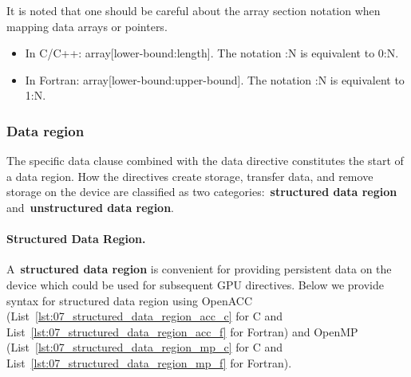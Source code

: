\par
It is noted that one should be careful about the array section notation when mapping data arrays or pointers.
\begin{itemize}
    \item In C/C++: array[lower-bound:length]. The notation :N is equivalent to 0:N.
    \item In Fortran: array[lower-bound:upper-bound]. The notation :N is equivalent to 1:N.
\end{itemize}


\subsubsection{Data region}


\par
The specific data clause combined with the data directive constitutes the start of a data region.
How the directives create storage, transfer data, and remove storage on the device are classified as two categories:~\textbf{structured data region} and~\textbf{unstructured data region}.


\paragraph{Structured Data Region.}
A~\textbf{structured data region} is convenient for providing persistent data on the device which could be used for subsequent GPU directives.
Below we provide syntax for structured data region using OpenACC (List~\ref{lst:07_structured_data_region_acc_c} for C and List~\ref{lst:07_structured_data_region_acc_f} for Fortran) and OpenMP (List~\ref{lst:07_structured_data_region_mp_c} for C and List~\ref{lst:07_structured_data_region_mp_f} for Fortran).











